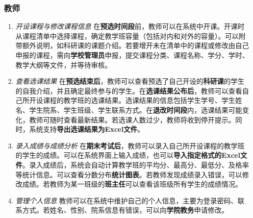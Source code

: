 \subsubsection{教师}
\begin{enumerate}
    \item \textit{开设课程与修改课程信息} \quad 在\textbf{预选时间段}前，教师可以在系统中开课。开课时从课程清单中选择课程，确定教学班容量（包括对内和对外的容量）。可以附带额外说明，如科研课的课题介绍。若要增开未在清单中的课程或修改由自己申报的课程，需向\textbf{学校管理员}申报，提交课程分类、课程名称、学分、学时、教学大纲等文件，并等待审核。
    \item \textit{查看选课结果} \quad 在\textbf{预选结束后}，教师可以查看预选了自己开设的\textbf{科研课}的学生的自我介绍，并且确定最终参与的学生。在\textbf{选课结果公布后}，教师可以查看自己所开设课程的教学班的选课结果。选课结果的信息包括学生学号、学生姓名、学生院系、学生班级、学生联系方式。在\textbf{退改时间段}内，选课结果可能变化，教师可随时查看最新结果。若选课人数过少，教师将收到停开提示。同时，系统支持\textbf{导出选课结果为Excel文件}。
    \item \textit{录入成绩与成绩分析} \quad 在\textbf{期末考试后}，教师可以录入自己所开设课程的教学班的学生的成绩。可以在系统界面上输入成绩，也可以\textbf{导入指定格式的Excel文件}。录入成绩后，系统会自动计算教学班的平均分、最高分、最低分、及格率等统计信息。可以查看分数分布\textbf{统计图表}。若教师发现成绩录入错误，可以修改成绩。若教师为某一班级的\textbf{班主任}可以查看该班级所有学生的成绩情况。
    \item \textit{管理个人信息} \quad 教师可以在系统中维护自己的个人信息，主要为登录密码、联系方式。若姓名、性别、院系信息有错误，可以向\textbf{学院教务}申请修改。
\end{enumerate}

